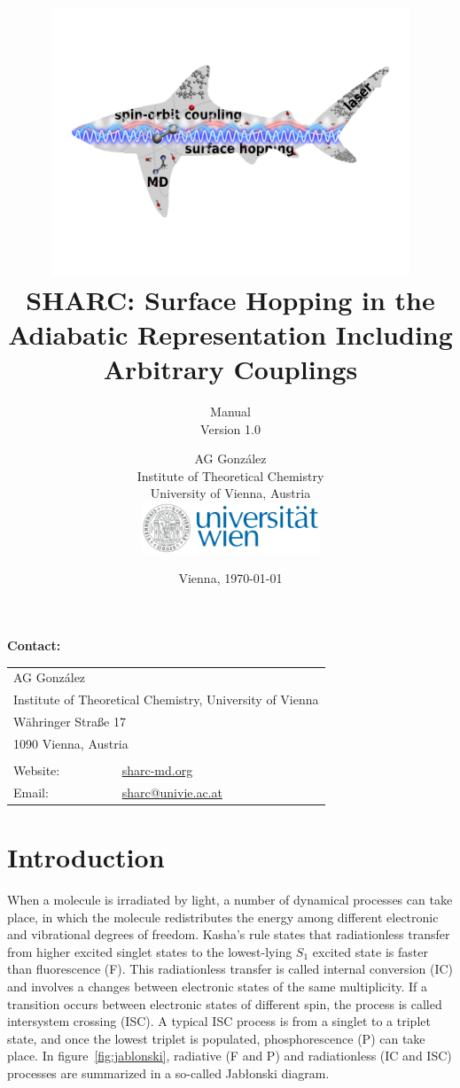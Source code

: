 \documentclass[a4paper,11pt,DIV=15,openany,twoside=false]{scrbook}
\title{\hspace{1cm}\includegraphics[width=0.8\textwidth,keepaspectratio=true]{img/sharc.pdf}\\[0.5cm]
    SHARC: Surface Hopping in the Adiabatic Representation Including Arbitrary Couplings}
\subtitle{Manual\\[1cm]Version 1.0}
\date{Vienna, \today}
\author{AG Gonz\'alez\\
Institute of Theoretical Chemistry\\
University of Vienna, Austria
\vspace{1cm}
\\
\includegraphics[width=0.4\textwidth,keepaspectratio=true]{img/univie.pdf}}
\newcommand{\tthdump}[1]{#1}
\begin{document}
\tpage

\tthdump{
  \begin{shaded}
    \textbf{Contact:}

    \begin{tabular}{ll}
      \\
      \multicolumn{2}{l}{AG Gonz\'alez}\\
      \multicolumn{2}{l}{Institute of Theoretical Chemistry, University of Vienna}\\
      \multicolumn{2}{l}{W\"ahringer Stra\ss{}e 17}\\
      \multicolumn{2}{l}{1090 Vienna, Austria}\\
      \\
      Website: &\href{http://sharc-md.org}{sharc-md.org}\\
      Email: &\href{mailto:sharc@univie.ac.at}{sharc@univie.ac.at}\\
    \end{tabular}
  \end{shaded}
}

\newpage
{}
\ohead{\rightmark}
\ofoot[\pagemark]{\pagemark}


\tableofcontents


\chapter{Introduction}

When a molecule is irradiated by light, a number of dynamical processes can take place, in which the molecule redistributes the energy among different electronic and vibrational degrees of freedom. Kasha's rule \cite{Kasha1950DFS} states that radiationless transfer from higher excited singlet states to the lowest-lying $S_1$ excited state is faster than fluorescence (F). This radiationless transfer is called internal conversion (IC) and involves a changes between electronic states of the same multiplicity. If a transition occurs between electronic states of different spin, the process is called intersystem crossing (ISC). A typical ISC process is from a singlet to a triplet state, and once the lowest triplet is populated, phosphorescence (P) can take place. In figure~\ref{fig:jablonski}, radiative (F and P) and radiationless (IC and ISC) processes are summarized in a so-called Jab{\l}onski diagram.
\end{document}
